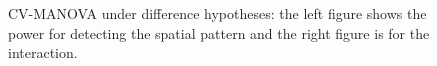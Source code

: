 \documentclass[english]{article}\usepackage[]{graphicx}\usepackage[]{color}
\begin{document}
\begin{figure}[H]
\begin{centering}
\par\end{centering}

\centering{}\protect\caption{CV-MANOVA under difference hypotheses: the left figure shows the power
for detecting the spatial pattern and the right figure is for the
interaction.\label{fig:CVMANOVA-ss}}
\end{figure}
\end{document}

